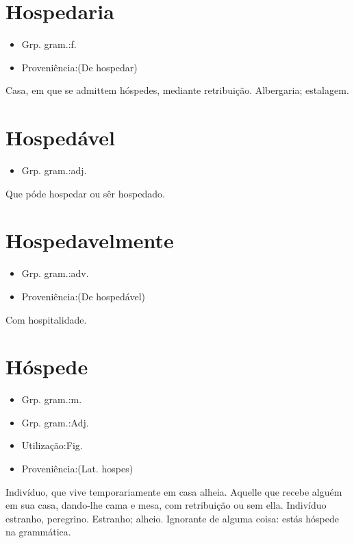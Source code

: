 \documentclass{article}
\begin{document}
\section{Hospedaria}
\begin{itemize}
\item {Grp. gram.:f.}
\end{itemize}
\begin{itemize}
\item {Proveniência:(De \textunderscore hospedar\textunderscore )}
\end{itemize}
Casa, em que se admittem hóspedes, mediante retribuição.
Albergaria; estalagem.
\section{Hospedável}
\begin{itemize}
\item {Grp. gram.:adj.}
\end{itemize}
Que póde hospedar ou sêr hospedado.
\section{Hospedavelmente}
\begin{itemize}
\item {Grp. gram.:adv.}
\end{itemize}
\begin{itemize}
\item {Proveniência:(De \textunderscore hospedável\textunderscore )}
\end{itemize}
Com hospitalidade.
\section{Hóspede}
\begin{itemize}
\item {Grp. gram.:m.}
\end{itemize}
\begin{itemize}
\item {Grp. gram.:Adj.}
\end{itemize}
\begin{itemize}
\item {Utilização:Fig.}
\end{itemize}
\begin{itemize}
\item {Proveniência:(Lat. \textunderscore hospes\textunderscore )}
\end{itemize}
Indivíduo, que vive temporariamente em casa alheia.
Aquelle que recebe alguém em sua casa, dando-lhe cama e mesa, com retribuição ou sem ella.
Indivíduo estranho, peregrino.
Estranho; alheio.
Ignorante de alguma coisa: \textunderscore estás hóspede na grammática\textunderscore .
\end{document}
